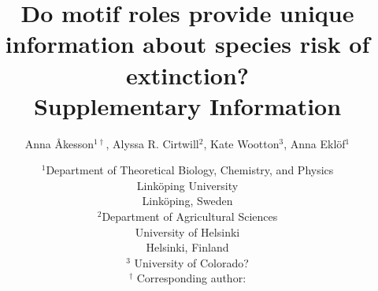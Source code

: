 \documentclass[12pt]{article}
\begin{document}
 

\title{Do motif roles provide unique information about species risk of extinction?\\ \medskip Supplementary Information}


\author{Anna \r{A}kesson$^{1\dagger}$, Alyssa R. Cirtwill$^{2}$, Kate Wootton$^{3}$, Anna Ekl\"{o}f$^{1}$} 
\date{\small$^1$Department of Theoretical Biology, Chemistry, and Physics\\ 
Link\"{o}ping University\\
Link\"{o}ping, Sweden\\
\medskip
\small$^2$Department of Agricultural Sciences\\
University of Helsinki\\
Helsinki, Finland\\
\medskip
\small$^3$ University of Colorado?\\
\medskip
$^\dagger$ Corresponding author:\\
}



\maketitle 
\raggedright
\end{document}
